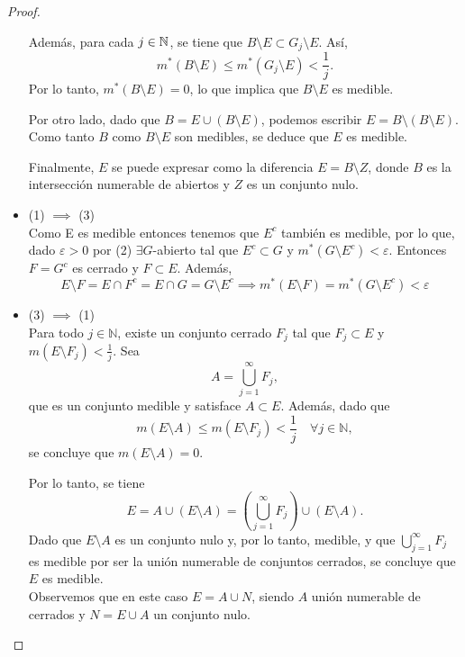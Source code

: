 \begin{proof}
\begin{itemize}
        Además, para cada \( j \in \mathbb{N} \), se tiene que \( B \setminus E \subset G_j \setminus E \). Así,
        \[
        m^*(B \setminus E) \leq m^*(G_j \setminus E) < \frac{1}{j}.
        \]
        Por lo tanto, \( m^*(B \setminus E) = 0 \), lo que implica que \( B \setminus E \) es medible.
        
        Por otro lado, dado que \( B = E \cup (B \setminus E) \), podemos escribir \( E = B \setminus (B \setminus E) \). Como tanto \( B \) como \( B \setminus E \) son medibles, se deduce que \( E \) es medible.
        
        Finalmente, \( E \) se puede expresar como la diferencia \( E = B \setminus Z \), donde \( B \) es la intersección numerable de abiertos y \( Z \) es un conjunto nulo.
        
        \item (1) $\implies$ (3)\\
              Como E es medible entonces tenemos que $E^c$ también es medible, por lo que, dado $\varepsilon > 0$ por (2) $\exists G$-abierto tal que $E^c \subset G$ y $m^*(G \setminus E^c) < \varepsilon$. Entonces $F = G^c$ es cerrado y $F \subset E$. Además, 
              $$E \setminus F = E \cap F^c = E \cap G = G \setminus E^c \implies m^*(E \setminus F) = m^*(G \setminus E^c) < \varepsilon$$
        \item (3) $\implies$ (1)\\
        Para todo \( j \in \mathbb{N} \), existe un conjunto cerrado \( F_j \) tal que \( F_j \subset E \) y \( m(E \setminus F_j) < \frac{1}{j} \). Sea 
        \[
        A = \bigcup_{j=1}^{\infty} F_j,
        \]
        que es un conjunto medible y satisface \( A \subset E \). Además, dado que
        \[
        m(E \setminus A) \leq m(E \setminus F_j) < \frac{1}{j} \quad \forall j \in \mathbb{N},
        \]
        se concluye que \( m(E \setminus A) = 0 \).
        
        Por lo tanto, se tiene
        \[
        E = A \cup (E \setminus A) = \left( \bigcup_{j=1}^{\infty} F_j \right) \cup (E \setminus A).
        \]
        Dado que \( E \setminus A \) es un conjunto nulo y, por lo tanto, medible, y que \( \bigcup_{j=1}^{\infty} F_j \) es medible por ser la unión numerable de conjuntos cerrados, se concluye que \( E \) es medible.\\
        Observemos que en este caso $E = A \cup N$, siendo $A$ unión numerable de cerrados y $N = E \cup A$ un conjunto nulo.        
    \end{itemize}
\end{proof}


